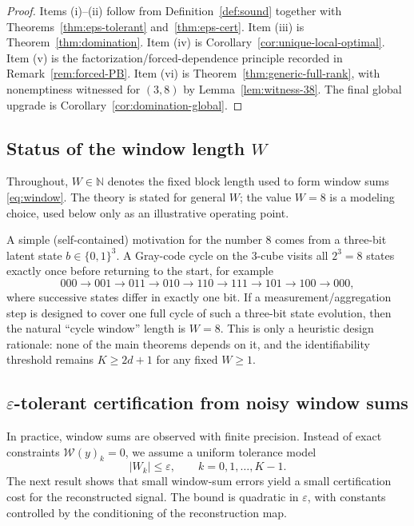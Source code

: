 \documentclass[11pt,reqno]{amsart}
\theoremstyle{definition}
\theoremstyle{remark}
\newcommand{\1}{\mathbf{1}}
\providecommand{\N}{\mathbb{N}}
\begin{document}
\begin{proof}
Items (i)–(ii) follow from Definition~\ref{def:sound} together with Theorems~\ref{thm:eps-tolerant} and~\ref{thm:eps-cert}.  Item (iii) is Theorem~\ref{thm:domination}.  Item (iv) is Corollary~\ref{cor:unique-local-optimal}.  Item (v) is the factorization/forced-dependence principle recorded in Remark~\ref{rem:forced-PB}.  Item (vi) is Theorem~\ref{thm:generic-full-rank}, with nonemptiness witnessed for $(3,8)$ by Lemma~\ref{lem:witness-38}.  The final global upgrade is Corollary~\ref{cor:domination-global}.
\end{proof}


\subsection{Status of the window length \texorpdfstring{$W$}{W}}\label{subsec:status-W}
Throughout, $W\in\N$ denotes the fixed block length used to form window sums \eqref{eq:window}.
The theory is stated for general $W$; the value $W=8$ is a modeling choice, used below only as an
illustrative operating point.

A simple (self-contained) motivation for the number $8$ comes from a three-bit latent state
$b\in\{0,1\}^3$. A Gray-code cycle on the 3-cube visits all $2^3=8$ states exactly once before
returning to the start, for example
\[
000\to 001\to 011\to 010\to 110\to 111\to 101\to 100\to 000,
\]
where successive states differ in exactly one bit. If a measurement/aggregation step is designed to
cover one full cycle of such a three-bit state evolution, then the natural ``cycle window'' length is
$W=8$. This is only a heuristic design rationale: none of the main theorems depends on it, and the
identifiability threshold remains $K\ge 2d+1$ for any fixed $W\ge 1$.

\subsection{\texorpdfstring{$\varepsilon$}{eps}-tolerant certification from noisy window sums}\label{subsec:eps-stability}
In practice, window sums are observed with finite precision. Instead of exact constraints
$\mathcal{W}(y)_k=0$, we assume a uniform tolerance model
\begin{equation}\label{eq:window-noise}
\bigl|W_k\bigr|\le \varepsilon,\qquad k=0,1,\dots,K-1.
\end{equation}
The next result shows that small window-sum errors yield a small certification cost for the
reconstructed signal. The bound is quadratic in $\varepsilon$, with constants controlled by the
conditioning of the reconstruction map.
\end{document}
